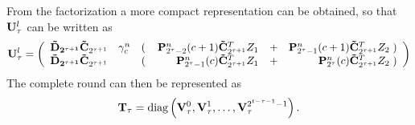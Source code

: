 From the factorization a more compact representation can be obtained, so that $\mathbf{U}_{\tau}^l$ can be written as
\begin{equation}
\label{UCompact}
\mathbf{U}_{\tau}^l = 
\left(\begin{array}{lclrcr}
\mathbf{\mathbf{\tilde{D}}_{2^{\tau+1}}\tilde{C}}_{2^{\tau+1}} & \gamma_{c}^n & \left(\right. & \mathbf{P}_{2^{\tau}-2}^n(c+1) \mathbf{\tilde{C}}^T_{2^{\tau+1}} Z_{1} & + & \mathbf{P}_{2^{\tau}-1}^n(c+1) \mathbf{\tilde{C}}^T_{2^{\tau+1}} Z_{2} \left.\right) \\
\mathbf{\mathbf{\tilde{D}}_{2^{\tau+1}}\tilde{C}}_{2^{\tau+1}} & & \left(\right. & \mathbf{P}_{2^{\tau}-1}^n(c) \mathbf{\tilde{C}}^T_{2^{\tau+1}} Z_{1} & + & \mathbf{P}_{2^{\tau}}^n(c) \mathbf{\tilde{C}}^T_{2^{\tau+1}} Z_{2} \left.\right)
\end{array}\right)
\end{equation}
The complete round can then be represented as $$\mathbf{T}_{\tau} = \text{diag}\left(\mathbf{V}_{\tau}^0,\mathbf{V}_{\tau}^1,\dots,\mathbf{V}_{\tau}^{2^{t-\tau-1}-1}\right).$$

